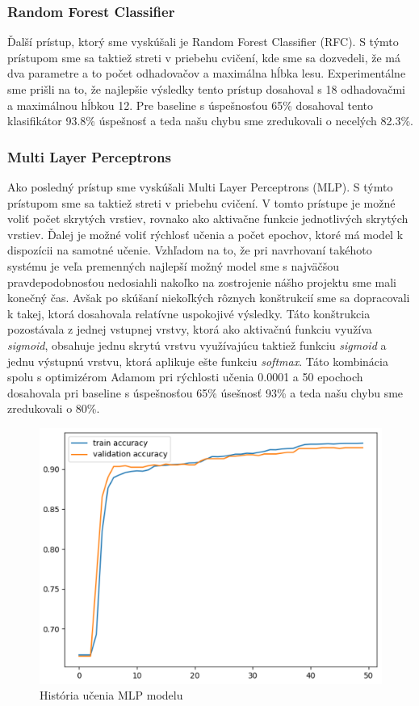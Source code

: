 \documentclass[12pt]{article}
\begin{document}
\subsubsection*{Random Forest Classifier}
Ďalší prístup, ktorý sme vyskúšali je Random Forest Classifier (RFC). S týmto prístupom sme sa taktiež streti v priebehu cvičení, kde sme sa dozvedeli, že má dva parametre a to počet odhadovačov a maximálna hĺbka lesu. Experimentálne sme prišli na to, že najlepšie výsledky tento prístup dosahoval s 18 odhadovačmi a maximálnou hĺbkou 12. Pre baseline s úspešnosťou 65\% dosahoval tento klasifikátor 93.8\% úspešnosť a teda našu chybu sme zredukovali o necelých 82.3\%.

\subsubsection*{Multi Layer Perceptrons}
Ako posledný prístup sme vyskúšali Multi Layer Perceptrons (MLP). S týmto prístupom sme sa taktiež streti v priebehu cvičení. V tomto prístupe je možné voliť počet skrytých vrstiev, rovnako ako aktivačne funkcie jednotlivých skrytých vrstiev. Ďalej je možné voliť rýchlosť učenia a počet epochov, ktoré má model k dispozícii na samotné učenie. Vzhľadom na to, že pri navrhovaní takéhoto systému je veľa premenných najlepší možný model sme s najväčšou pravdepodobnosťou nedosiahli nakoľko na zostrojenie nášho projektu sme mali konečný čas. Avšak po skúšaní niekoľkých rôznych konštrukcií sme sa dopracovali k takej, ktorá dosahovala relatívne uspokojivé výsledky. Táto konštrukcia pozostávala z jednej vstupnej vrstvy, ktorá ako aktivačnú funkciu využíva \textit{sigmoid}, obsahuje jednu skrytú vrstvu využívajúcu taktiež funkciu \textit{sigmoid} a jednu výstupnú vrstvu, ktorá aplikuje ešte funkciu \textit{softmax}. Táto kombinácia spolu s optimizérom Adamom pri rýchlosti učenia 0.0001 a 50 epochoch dosahovala pri baseline s úspešnosťou 65\% úsešnosť 93\% a teda našu chybu sme zredukovali o 80\%.\\

\begin{figure}[!h]
\centering
\includegraphics[scale=0.5]{mlp}
\caption{História učenia MLP modelu}
\end{figure}
\end{document}
